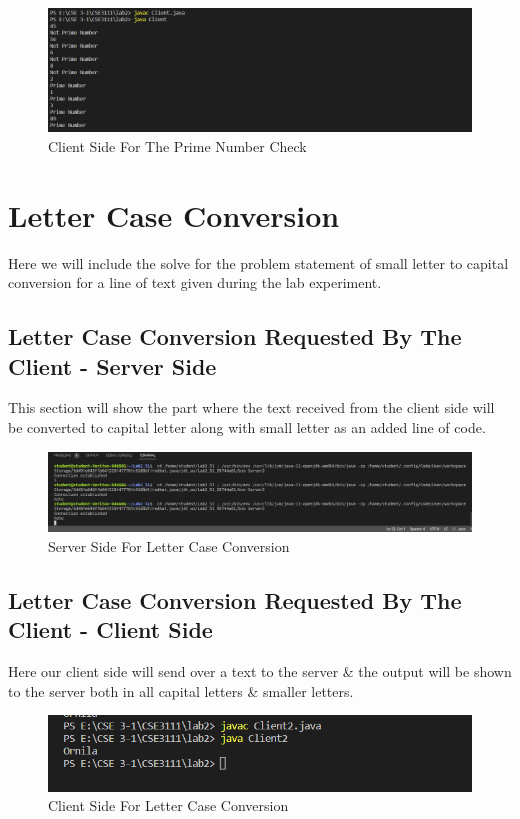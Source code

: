 \documentclass[11pt]{article}
\begin{document}


\begin{figure}[!h]
\centering
\includegraphics[width=\textwidth]{prime_client.png}
\caption{Client Side For The Prime Number Check}
\end{figure}
\newpage
\section{Letter Case Conversion}
Here we will include the solve for the problem statement of small letter to capital conversion for a line of text given during the lab experiment.
\subsection{Letter Case Conversion Requested By The Client - Server Side }
This section will show the part where the text received from the client side will be converted to capital letter along with small letter as an added line of code.


\begin{figure}[!h]
\centering
\includegraphics[width=\textwidth]{case_server.png}
\caption{Server Side For Letter Case Conversion}
\end{figure}


\subsection{Letter Case Conversion Requested By The Client - Client Side}
Here our client side will send over a text to the server & the output will be shown to the server both in all capital letters & smaller letters. 


\begin{figure}[!h]
\centering
\includegraphics[width=\textwidth]{case_client.png}
\caption{Client Side For Letter Case Conversion}
\end{figure}
\end{document}

